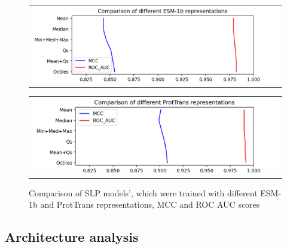 \documentclass[12pt]{article}
\begin{document}
	\newpage

	\begin{figure}[h!]
		\centering
		\begin{tabular}{@{}c@{}}
			\includegraphics[scale=0.7]{SLP_ESM_003_diff_representations.png}
		\end{tabular}

		\begin{tabular}{@{}c@{}}
			\includegraphics[scale=0.7]{SLP_PT_003_diff_representations.png}
		\end{tabular}
		
		\caption{Comparison of SLP models', which were trained with different
		ESM-1b and ProtTrans representations, MCC and ROC AUC scores}
		\label{figure:scoresRepresentationsESMandPT}
	\end{figure}

	\newpage

	\subsection{Architecture analysis}
\end{document}
